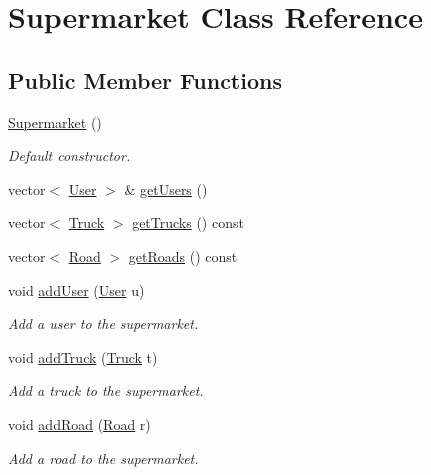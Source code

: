 \hypertarget{class_supermarket}{}\section{Supermarket Class Reference}
\label{class_supermarket}
\subsection*{Public Member Functions}
\begin{DoxyCompactItemize}
\item 
\mbox{\label{class_supermarket_a637738d742f352615e0e82022344bb2c}} 
\hyperlink{class_supermarket_a637738d742f352615e0e82022344bb2c}{Supermarket} ()
\begin{DoxyCompactList}\small\item\em Default constructor. \end{DoxyCompactList}\item 
vector$<$ \hyperlink{class_user}{User} $>$ \& \hyperlink{class_supermarket_afd4a6608933bbdb0937fd69804cfe5ff}{get\+Users} ()
\item 
vector$<$ \hyperlink{class_truck}{Truck} $>$ \hyperlink{class_supermarket_a7f7bb99593c521362fd5df23368beb94}{get\+Trucks} () const
\item 
vector$<$ \hyperlink{class_road}{Road} $>$ \hyperlink{class_supermarket_a3fdea775417ae5f96cd99eff5759c46e}{get\+Roads} () const
\item 
void \hyperlink{class_supermarket_a89fbe6a4ae27587af7dc9644f84bd5d5}{add\+User} (\hyperlink{class_user}{User} u)
\begin{DoxyCompactList}\small\item\em Add a user to the supermarket. \end{DoxyCompactList}\item 
void \hyperlink{class_supermarket_a6c3cb4629ad39cfd581fb6527390f13f}{add\+Truck} (\hyperlink{class_truck}{Truck} t)
\begin{DoxyCompactList}\small\item\em Add a truck to the supermarket. \end{DoxyCompactList}\item 
void \hyperlink{class_supermarket_ae26172ed726f1c54cfdbf425552647b1}{add\+Road} (\hyperlink{class_road}{Road} r)
\begin{DoxyCompactList}\small\item\em Add a road to the supermarket. \end{DoxyCompactList}\item 

\end{DoxyCompactItemize}
